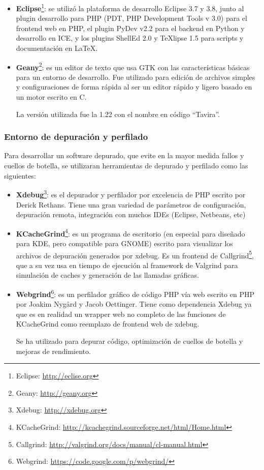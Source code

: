 \begin{itemize}

\item \textbf{Eclipse}\footnote{Eclipse:
\url{http://eclise.org}\label{ftn:Eclipse}}: se utilizó la plataforma de
desarrollo Eclipse 3.7 y 3.8, junto al plugin desarrollo para PHP (PDT, PHP
Development Tools v 3.0) para el frontend web en PHP, el plugin PyDev v2.2 para el backend en Python y desarrollo en ICE,
y los plugins ShellEd 2.0 y TeXlipse 1.5 para scripts y documentación en
LaTeX.

\item \textbf{Geany}\footnote{Geany:
\url{http://geany.org}\label{ftn:Geany}}: es un editor de texto que usa GTK
con las características básicas para un entorno de desarrollo. Fue utilizado
para edición de archivos simples y configuraciones de forma rápida al ser
un editor rápido y ligero basado en un motor escrito en C.

La versión utilizada fue la 1.22 con el nombre en código ``Tavira''.
\end{itemize}

\subsubsection{Entorno de depuración y perfilado}

Para desarrollar un software depurado, que evite en la mayor medida fallos y
cuellos de botella, se utilizaran herramientas de depurado y perfilado como las
siguientes:

\begin{itemize}

\item \textbf{Xdebug}\footnote{Xdebug:
\url{http://xdebug.org}\label{ftn:XDebug}}: es el depurador y perfilador por
excelencia de PHP escrito por Derick Rethans. Tiene una gran variedad de parámetros de configuración, depuración remota, integración con muchos IDEs (Eclipse,
Netbeans, etc)

\item \textbf{KCacheGrind}\footnote{KCacheGrind:
\url{http://kcachegrind.sourceforge.net/html/Home.html}\label{ftn:KCacheGrind}}:
es un programa de escritorio (en especial para diseñado para KDE, pero compatible para GNOME) escrito para visualizar los
archivos de depuración generados por xdebug. Es un frontend de
Callgrind\footnote{Callgrind:
\url{http://valgrind.org/docs/manual/cl-manual.html}\label{ftn:Callgrind}},
que a su vez usa en tiempo de ejecución al framework de Valgrind para simulación de caches y generación de las llamadas gráficas.

\newpage
\item \textbf{Webgrind}\footnote{Webgrind:
\url{https://code.google.com/p/webgrind/}\label{ftn:Webgrind}}: es un
perfilador gráfico de código PHP vía web escrito en PHP por Joakim Nygård y Jacob Oettinger.
Tiene como dependencia Xdebug ya que es en realidad un wrapper web no
completo de las funciones de KCacheGrind como reemplazo de
frontend web de xdebug.

Se ha utilizado para depurar código, optimización de cuellos de botella y mejoras de rendimiento.

\end{itemize}

